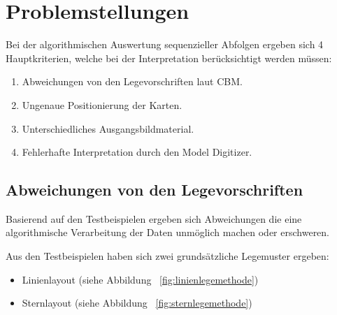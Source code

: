 \section{Problemstellungen} %
\label{sec:problemstellungen}
Bei der algorithmischen Auswertung sequenzieller Abfolgen ergeben sich 4 Hauptkriterien, welche bei der Interpretation berücksichtigt werden müssen:
\begin{enumerate}
	\item Abweichungen von den Legevorschriften laut CBM.
	\item Ungenaue Positionierung der Karten.
	\item Unterschiedliches Ausgangsbildmaterial.
	\item Fehlerhafte Interpretation durch den Model Digitizer.
\end{enumerate}

\subsection{Abweichungen von den Legevorschriften} %
\label{ssub:abweichung_von_der_legevorschriften}
Basierend auf den Testbeispielen \cite{max} ergeben sich Abweichungen die eine algorithmische Verarbeitung der Daten unmöglich machen oder erschweren.

Aus den Testbeispielen haben sich zwei grundsätzliche Legemuster ergeben:

\begin{itemize}
	\item Linienlayout (siehe Abbildung ~\ref{fig:linienlegemethode}) 
	\item Sternlayout (siehe Abbildung ~\ref{fig:sternlegemethode}) 
\end{itemize}

